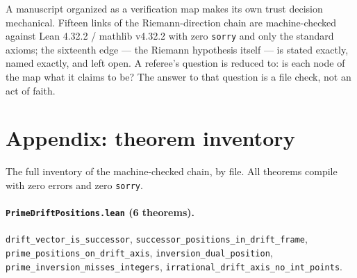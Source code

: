 \documentclass[sigplan,10pt,anonymous,review]{acmart}
\begin{document}
A manuscript organized as a verification map makes its own trust
decision mechanical. Fifteen links of the Riemann-direction chain are
machine-checked against Lean 4.32.2 / mathlib v4.32.2 with zero
\texttt{sorry} and only the standard axioms; the sixteenth edge --- the
Riemann hypothesis itself --- is stated exactly, named exactly, and left
open. A referee's question is reduced to: is each node of the map what it
claims to be? The answer to that question is a file check, not an act of
faith.

\section*{Appendix: theorem inventory}

The full inventory of the machine-checked chain, by file. All theorems
compile with zero errors and zero \texttt{sorry}.

\paragraph{\texttt{PrimeDriftPositions.lean} (6 theorems).}
\texttt{drift\_vector\_is\_successor},
\texttt{successor\_positions\_in\_drift\_frame},
\texttt{prime\_positions\_on\_drift\_axis},
\texttt{inversion\_dual\_position},
\texttt{prime\_inversion\_misses\_integers},
\texttt{irrational\_drift\_axis\_no\_int\_points}.
\end{document}
